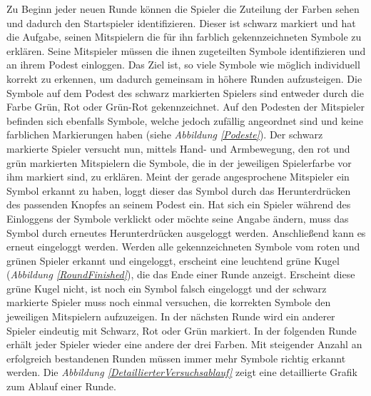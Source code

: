 \documentclass[a4paper,11pt]{article}%
\renewcommand{\\}{\vspace*{0.5\baselineskip} \newline}
\begin{document}
{Zu Beginn jeder neuen Runde können die Spieler die Zuteilung der Farben sehen und dadurch den Startspieler identifizieren. Dieser ist schwarz markiert und hat die Aufgabe, seinen Mitspielern die für ihn farblich gekennzeichneten Symbole zu erklären. Seine Mitspieler müssen die ihnen zugeteilten Symbole identifizieren und an ihrem Podest einloggen. Das Ziel ist, so viele Symbole wie möglich individuell korrekt zu erkennen, um dadurch gemeinsam in höhere Runden aufzusteigen.
Die Symbole auf dem Podest des schwarz markierten Spielers sind entweder durch die Farbe Grün, Rot oder Grün-Rot gekennzeichnet. Auf den Podesten der Mitspieler befinden sich ebenfalls Symbole, welche jedoch zufällig angeordnet sind und keine farblichen Markierungen haben (siehe \textit{Abbildung \ref{Podeste}}). Der schwarz markierte Spieler versucht nun, mittels Hand- und Armbewegung, den rot und grün markierten Mitspielern die Symbole, die in der jeweiligen Spielerfarbe vor ihm markiert sind, zu erklären. Meint der gerade angesprochene Mitspieler ein Symbol erkannt zu haben, loggt dieser das Symbol durch das Herunterdrücken des passenden Knopfes an seinem Podest ein. Hat sich ein Spieler während des Einloggens der Symbole verklickt oder möchte seine Angabe ändern, muss das Symbol durch erneutes Herunterdrücken ausgeloggt werden. Anschließend kann es erneut eingeloggt werden. Werden alle gekennzeichneten Symbole vom roten und grünen Spieler erkannt und eingeloggt, erscheint eine leuchtend grüne Kugel (\textit{Abbildung \ref{RoundFinished}}), die das Ende einer Runde anzeigt. Erscheint diese grüne Kugel nicht, ist noch ein Symbol falsch eingeloggt und der schwarz markierte Spieler muss noch einmal versuchen, die korrekten Symbole den jeweiligen Mitspielern aufzuzeigen. 
In der nächsten Runde wird ein anderer Spieler eindeutig mit Schwarz, Rot oder Grün markiert.
In der folgenden Runde erhält jeder Spieler wieder eine andere der drei Farben. Mit steigender Anzahl an erfolgreich bestandenen Runden müssen immer mehr Symbole richtig erkannt werden. 
Die \textit{Abbildung \ref{DetaillierterVersuchsablauf}} zeigt eine detaillierte Grafik zum Ablauf einer Runde.

}
\end{document}
